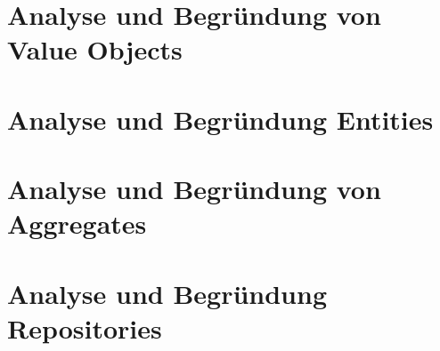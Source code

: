 \documentclass[12pt]{article}
\begin{document}
\newpage

\section{Analyse und Begründung von Value Objects}

\newpage

\section{Analyse und Begründung Entities}

\newpage

\section{Analyse und Begründung von Aggregates}

\newpage

\section{Analyse und Begründung Repositories}
\end{document}

